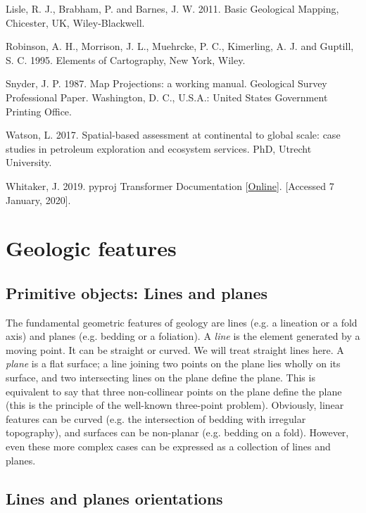 \documentclass[a4paper , 12pt]{book}
\begin{document}
Lisle, R. J., Brabham, P. and Barnes, J. W. 2011. Basic Geological Mapping, Chicester, UK, Wiley-Blackwell.

Robinson, A. H., Morrison, J. L., Muehrcke, P. C., Kimerling, A. J. and Guptill, S. C. 1995. Elements of Cartography, New York, Wiley.

Snyder, J. P. 1987. Map Projections: a working manual. Geological Survey Professional Paper. Washington, D. C., U.S.A.: United States Government Printing Office.

Watson, L. 2017. Spatial-based assessment at continental to global scale: case studies in petroleum exploration and ecosystem services. PhD, Utrecht University.

Whitaker, J. 2019. pyproj Transformer Documentation [\href{https://pyproj4.github.io/pyproj/stable/api/transformer.html?highlight=transformer}{Online}].  [Accessed 7 January, 2020].

\chapter{Geologic features}

\section{Primitive objects: Lines and planes}

The fundamental geometric features of geology are lines (e.g. a lineation or a fold axis) and planes (e.g. bedding or a foliation). A \textit{line} is the element generated by a moving point. It can be straight or curved. We will treat straight lines here. A \textit{plane} is a flat surface; a line joining two points on the plane lies wholly on its surface, and two intersecting lines on the plane define the plane. This is equivalent to say that three non-collinear points on the plane define the plane (this is the principle of the well-known three-point problem). Obviously, linear features can be curved (e.g. the intersection of bedding with irregular topography), and surfaces can be non-planar (e.g. bedding on a fold). However, even these more complex cases can be expressed as a collection of lines and planes.

\section{Lines and planes orientations}
\end{document}
